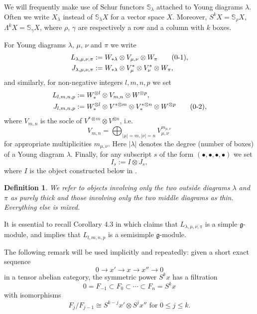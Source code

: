 \documentclass[11pt]{article}
\theoremstyle{plain}
\theoremstyle{nonumberplain}
\theoremstyle{plain}
\newtheorem{definition}[lemma]{Definition}
\numberwithin{equation}{section}
\renewcommand{\theequation}{\thesection-\arabic{equation}}
\theoremstyle{nonumberplain}
\newcommand\bS{{\mathbb S}}
\newcommand\fg{{\mathfrak g}}
\newcommand\1{{\bf 1}}
\newcommand\numberthis{\addtocounter{equation}{1}\tag{\theequation}}
\begin{document}
We will frequently make use of Schur functors $\mathbb{S}_{\lambda}$ attached to Young diagrams $\lambda$. Often we write $X_{\lambda}$ instead of $\bS_{\lambda} X$ for a vector space $X$. Moreover, $S^k X=\mathbb{S}_{\rho} X$, $\Lambda^k X=\mathbb{S}_{\gamma}X$, where $\rho$, $\gamma$ are respectively a row and a column with $k$ boxes.

For Young diagrams $\lambda$, $\mu$, $\nu$ and $\pi$ we write
\begin{align*}
  L_{\lambda,\mu,\nu,\pi}&:=W_{*\lambda}\otimes V_{\mu,\nu}\otimes W_{\pi}\label{eq:s}\numberthis, \\
  J_{\lambda,\mu,\nu,\pi}&:=W_{*\lambda}\otimes V^*_{\mu}\otimes V^*_{\nu}\otimes W_{\pi},
\end{align*}
and similarly, for non-negative integers $l,m,n,p$ we set
\begin{align*}
  L_{l,m,n,p}&:=W_*^{\otimes l}\otimes V_{m,n}\otimes W^{\otimes p},\\
  J_{l,m,n,p}&:=W_*^{\otimes l}\otimes V^{*\otimes m}\otimes V_*^{*\otimes n}\otimes W^{\otimes p}\label{eq:j}\numberthis,
\end{align*}
where $V_{m,n}$ is the socle of $V^{*\otimes m}\otimes V^{\otimes n}$, i.e.
\begin{equation*}
  V_{m,n}=\bigoplus_{|\mu|=m,|\nu|=n}V_{\mu,\nu}^{m_{\mu,\nu}}
\end{equation*}
for appropriate multiplicities $m_{\mu,\nu}$. Here $|\lambda|$ denotes the degree (number of boxes) of a Young diagram $\lambda$. Finally, for any subscript $s$ of the form $(\bullet,\bullet,\bullet,\bullet)$ we set
\begin{equation}\label{eq:13}
  I_s:=I\otimes J_s,
\end{equation}
where $I$ is the object constructed below in . 

\begin{definition}\label{def.thk}
  We refer to objects involving only the two outside diagrams $\lambda$ and $\pi$ as {\it purely thick} %
  and those involving only the two middle diagrams as {\it thin}. Everything else is {\it mixed}. 
\end{definition}

It is essential to recall Corollary 4.3 in \cite{us0} which claims that $L_{\lambda,\mu,\nu,\pi}$ is a simple $\fg$-module, and implies that $L_{l,m,n,p}$ is a semisimple $\fg$-module.

The following remark will be used implicitly and repeatedly: given a short exact sequence
\begin{equation*}
  0\to x'\to x\to x''\to 0
\end{equation*}
in a tensor abelian category, the symmetric power $S^kx$ has a filtration
\begin{equation*}
  0=F_{-1}\subset F_0\subset \cdots\subset F_n = S^k x
\end{equation*}
with isomorphisms
\begin{equation*}
  F_j/F_{j-1} \cong S^{k-j} x'\otimes S^jx'' \text{ for }  0\le j\le k. 
\end{equation*}
\end{document}
